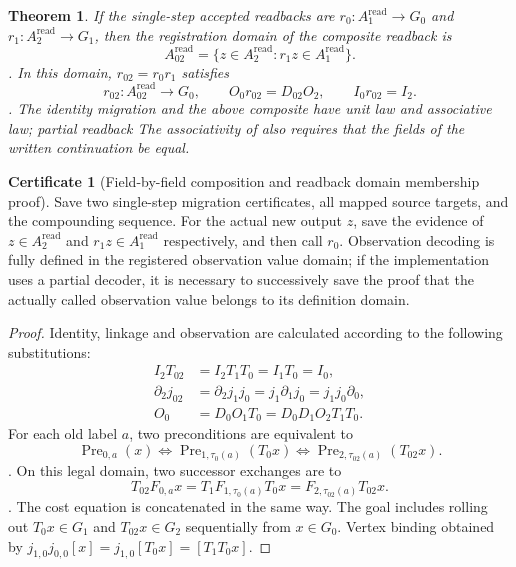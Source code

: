 \documentclass[12pt,a4paper,openany,notitlepage]{report}
\theoremstyle{plain}
\newtheorem{theorem}{Theorem}[chapter]
\theoremstyle{definition}
\newtheorem*{certificate}{Certificate}
\theoremstyle{remark}
\def\mathcal#1{#1}\def\mathsf#1{#1}\def\mathbb#1{#1}%
\begin{document}
\begin{CJK*}
\begin{theorem}
If the single-step accepted readbacks are $r_0:\mathcal A_1^{\mathrm{read}}\to G_0$ and $r_1:\mathcal A_2^{\mathrm{read}}\to G_1$, then the registration domain of the composite readback is \[
 \mathcal A_{02}^{\mathrm{read}}
 =\{z\in\mathcal A_2^{\mathrm{read}}:
             r_1z\in\mathcal A_1^{\mathrm{read}}\}.
\]. In this domain, $r_{02}=r_0r_1$ satisfies \[
 r_{02}:\mathcal A_{02}^{\mathrm{read}}\to G_0,
 \qquad O_0r_{02}=D_{02}O_2,
 \qquad I_0r_{02}=I_2.
\]. The identity migration and the above composite have unit law and associative law; partial readback The associativity of also requires that the fields of the written continuation be equal.\end{theorem}
\begin{certificate}
[Field-by-field composition and readback domain membership proof]Save two single-step migration certificates, all mapped source targets, and the compounding sequence. For the actual new output $z$, save the evidence of $z\in\mathcal A_2^{\mathrm{read}}$ and $r_1z\in\mathcal A_1^{\mathrm{read}}$ respectively, and then call $r_0$. Observation decoding is fully defined in the registered observation value domain; if the implementation uses a partial decoder, it is necessary to successively save the proof that the actually called observation value belongs to its definition domain.\end{certificate}
\begin{proof}
Identity, linkage and observation are calculated according to the following substitutions: \[
\begin{aligned}
 I_2T_{02}&=I_2T_1T_0=I_1T_0=I_0,\\
 \partial_2j_{02}
 &=\partial_2j_1j_0=j_1\partial_1j_0=j_1j_0\partial_0,\\
 O_0&=D_0O_1T_0=D_0D_1O_2T_1T_0.
\end{aligned}
\] For each old label $a$, two preconditions are equivalent to \[
 \operatorname{Pre}_{0,a}(x)
 \Longleftrightarrow
 \operatorname{Pre}_{1,\tau_0(a)}(T_0x)
 \Longleftrightarrow
 \operatorname{Pre}_{2,\tau_{02}(a)}(T_{02}x).
\]. On this legal domain, two successor exchanges are to \[
 T_{02}F_{0,a}x
 =T_1F_{1,\tau_0(a)}T_0x
 =F_{2,\tau_{02}(a)}T_{02}x.
\]. The cost equation is concatenated in the same way. The goal includes rolling out $T_0x\in G_1$ and $T_{02}x\in G_2$ sequentially from $x\in G_0$. Vertex binding obtained by $j_{1,0}j_{0,0}[x]=j_{1,0}[T_0x]=[T_1T_0x]$.


\end{proof}
\end{CJK*}
\end{document}
